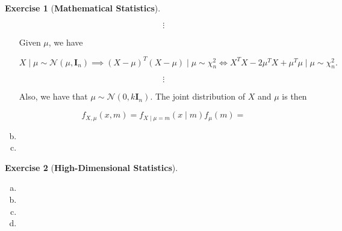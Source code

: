\documentclass{article}
\theoremstyle{definition}
\newtheorem{exercise}{Exercise}
\theoremstyle{definition}
\theoremstyle{definition}
\theoremstyle{definition}
\begin{document}
\begin{exercise}[\textbf{Mathematical Statistics}]
\begin{enumerate}[(a)]
\[
\vdots
\]

Given \(\mu\), we have 

\[
X \mid \mu  \sim \mathcal{N} (\mu, \boldsymbol{I}_n) \implies (X - \mu)^T(X- \mu) \mid \mu \sim \chi_n^2 \iff X^TX - 2 \mu^TX + \mu^T\mu \mid \mu \sim \chi_n^2. 
\]

\[
\vdots
\]


Also, we have that \(\mu \sim \mathcal{N}(0, k \boldsymbol{I}_n)\). The joint distribution of \(X\) and \(\mu\) is then

\[
f_{X, \mu}(x, m) = f_{X \mid \mu = m}(x \mid m) f_\mu(m) = 
\]

\item

\item

\end{enumerate}

\end{exercise}

\begin{exercise}[\textbf{High-Dimensional Statistics}]

\begin{enumerate}[(a)]

\item

\item

\item

\item

\end{enumerate}

\end{exercise}
\end{document}
